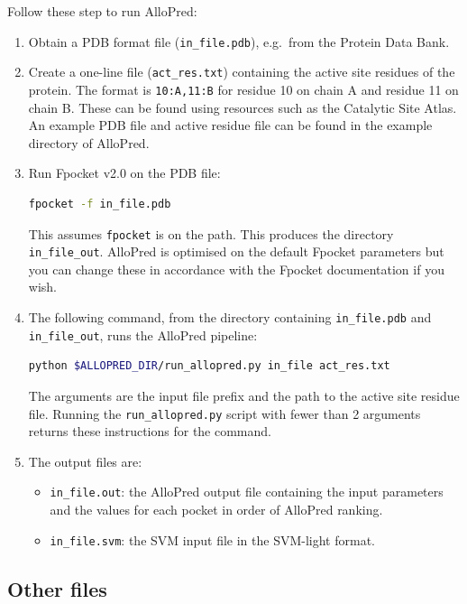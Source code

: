 Follow these step to run AlloPred:

\begin{enumerate}
\item Obtain a PDB format file (\verb|in_file.pdb|), e.g.\ from the Protein Data Bank.

\item Create a one-line file (\verb|act_res.txt|) containing the active site residues of the protein. The format is \verb|10:A,11:B| for residue 10 on chain A and residue 11 on chain B. These can be found using resources such as the Catalytic Site Atlas. An example PDB file and active residue file can be found in the example directory of AlloPred.

\item Run Fpocket v2.0 on the PDB file:
\begin{lstlisting}[language=bash]
    fpocket -f in_file.pdb
\end{lstlisting}
This assumes \verb|fpocket| is on the path. This produces the directory \verb|in_file_out|. AlloPred is optimised on the default Fpocket parameters but you can change these in accordance with the Fpocket documentation if you wish.

\item The following command, from the directory containing \verb|in_file.pdb| and \verb|in_file_out|, runs the AlloPred pipeline:
\begin{lstlisting}[language=bash]
    python $ALLOPRED_DIR/run_allopred.py in_file act_res.txt
\end{lstlisting}
The arguments are the input file prefix and the path to the active site residue file. Running the \verb|run_allopred.py| script with fewer than 2 arguments returns these instructions for the command.

\item The output files are:
    \begin{itemize}
    \item \verb|in_file.out|: the AlloPred output file containing the input parameters and the values for each pocket in order of AlloPred ranking.
    \item \verb|in_file.svm|: the SVM input file in the SVM-light format.
    \end{itemize}
\end{enumerate}


\subsection{Other files}

